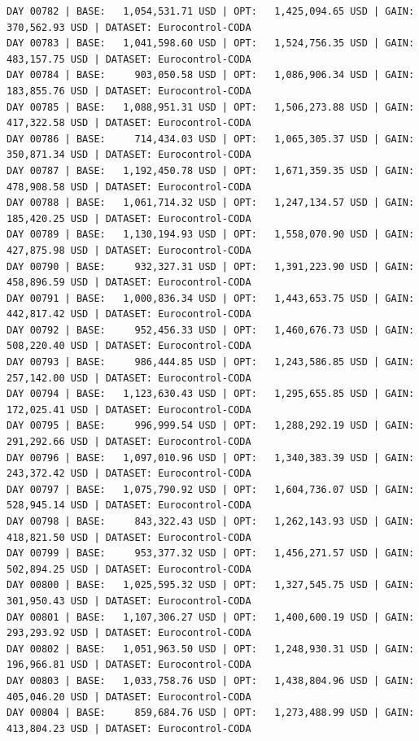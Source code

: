 \documentclass[11pt,a4paper]{article}
\begin{document}
\begin{verbatim}
DAY 00782 | BASE:   1,054,531.71 USD | OPT:   1,425,094.65 USD | GAIN: 370,562.93 USD | DATASET: Eurocontrol-CODA
DAY 00783 | BASE:   1,041,598.60 USD | OPT:   1,524,756.35 USD | GAIN: 483,157.75 USD | DATASET: Eurocontrol-CODA
DAY 00784 | BASE:     903,050.58 USD | OPT:   1,086,906.34 USD | GAIN: 183,855.76 USD | DATASET: Eurocontrol-CODA
DAY 00785 | BASE:   1,088,951.31 USD | OPT:   1,506,273.88 USD | GAIN: 417,322.58 USD | DATASET: Eurocontrol-CODA
DAY 00786 | BASE:     714,434.03 USD | OPT:   1,065,305.37 USD | GAIN: 350,871.34 USD | DATASET: Eurocontrol-CODA
DAY 00787 | BASE:   1,192,450.78 USD | OPT:   1,671,359.35 USD | GAIN: 478,908.58 USD | DATASET: Eurocontrol-CODA
DAY 00788 | BASE:   1,061,714.32 USD | OPT:   1,247,134.57 USD | GAIN: 185,420.25 USD | DATASET: Eurocontrol-CODA
DAY 00789 | BASE:   1,130,194.93 USD | OPT:   1,558,070.90 USD | GAIN: 427,875.98 USD | DATASET: Eurocontrol-CODA
DAY 00790 | BASE:     932,327.31 USD | OPT:   1,391,223.90 USD | GAIN: 458,896.59 USD | DATASET: Eurocontrol-CODA
DAY 00791 | BASE:   1,000,836.34 USD | OPT:   1,443,653.75 USD | GAIN: 442,817.42 USD | DATASET: Eurocontrol-CODA
DAY 00792 | BASE:     952,456.33 USD | OPT:   1,460,676.73 USD | GAIN: 508,220.40 USD | DATASET: Eurocontrol-CODA
DAY 00793 | BASE:     986,444.85 USD | OPT:   1,243,586.85 USD | GAIN: 257,142.00 USD | DATASET: Eurocontrol-CODA
DAY 00794 | BASE:   1,123,630.43 USD | OPT:   1,295,655.85 USD | GAIN: 172,025.41 USD | DATASET: Eurocontrol-CODA
DAY 00795 | BASE:     996,999.54 USD | OPT:   1,288,292.19 USD | GAIN: 291,292.66 USD | DATASET: Eurocontrol-CODA
DAY 00796 | BASE:   1,097,010.96 USD | OPT:   1,340,383.39 USD | GAIN: 243,372.42 USD | DATASET: Eurocontrol-CODA
DAY 00797 | BASE:   1,075,790.92 USD | OPT:   1,604,736.07 USD | GAIN: 528,945.14 USD | DATASET: Eurocontrol-CODA
DAY 00798 | BASE:     843,322.43 USD | OPT:   1,262,143.93 USD | GAIN: 418,821.50 USD | DATASET: Eurocontrol-CODA
DAY 00799 | BASE:     953,377.32 USD | OPT:   1,456,271.57 USD | GAIN: 502,894.25 USD | DATASET: Eurocontrol-CODA
DAY 00800 | BASE:   1,025,595.32 USD | OPT:   1,327,545.75 USD | GAIN: 301,950.43 USD | DATASET: Eurocontrol-CODA
DAY 00801 | BASE:   1,107,306.27 USD | OPT:   1,400,600.19 USD | GAIN: 293,293.92 USD | DATASET: Eurocontrol-CODA
DAY 00802 | BASE:   1,051,963.50 USD | OPT:   1,248,930.31 USD | GAIN: 196,966.81 USD | DATASET: Eurocontrol-CODA
DAY 00803 | BASE:   1,033,758.76 USD | OPT:   1,438,804.96 USD | GAIN: 405,046.20 USD | DATASET: Eurocontrol-CODA
DAY 00804 | BASE:     859,684.76 USD | OPT:   1,273,488.99 USD | GAIN: 413,804.23 USD | DATASET: Eurocontrol-CODA

\end{verbatim}
\end{document}
